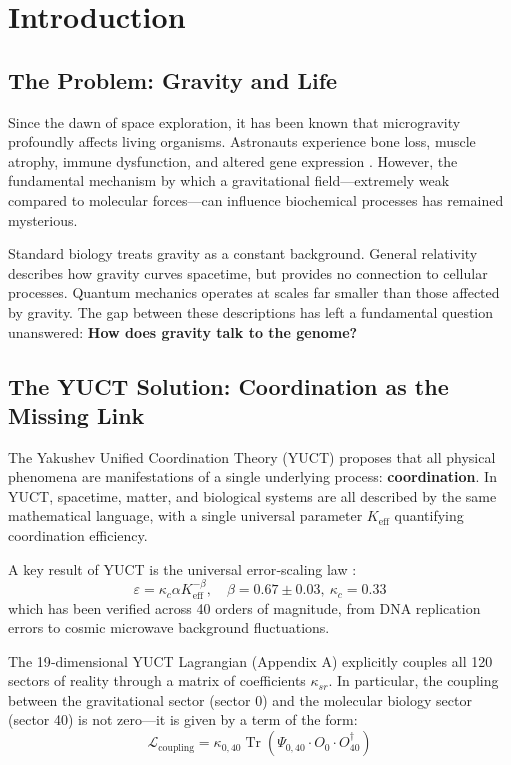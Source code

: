 \documentclass[12pt,a4paper]{article}
\theoremstyle{remark}
\newcommand{\Keff}{K_{\mathrm{eff}}}
\newcommand{\kappac}{\kappa_c}
\newcommand{\eps}{\varepsilon}
\begin{document}
	\tableofcontents
	\newpage
	
	\section{Introduction}
	\label{sec:intro}
	
	\subsection{The Problem: Gravity and Life}
	
	Since the dawn of space exploration, it has been known that microgravity profoundly affects living organisms. Astronauts experience bone loss, muscle atrophy, immune dysfunction, and altered gene expression \cite{NASA-GeneLab, SpaceX-2023}. However, the fundamental mechanism by which a gravitational field—extremely weak compared to molecular forces—can influence biochemical processes has remained mysterious.
	
	Standard biology treats gravity as a constant background. General relativity describes how gravity curves spacetime, but provides no connection to cellular processes. Quantum mechanics operates at scales far smaller than those affected by gravity. The gap between these descriptions has left a fundamental question unanswered: \textbf{How does gravity talk to the genome?}
	
	\subsection{The YUCT Solution: Coordination as the Missing Link}
	
	The Yakushev Unified Coordination Theory (YUCT) proposes that all physical phenomena are manifestations of a single underlying process: \textbf{coordination}. In YUCT, spacetime, matter, and biological systems are all described by the same mathematical language, with a single universal parameter \(\Keff\) quantifying coordination efficiency.
	
	A key result of YUCT is the universal error‑scaling law \cite{AppendixL}:
	\begin{equation}
		\eps = \kappac \alpha \Keff^{-\beta}, \quad \beta = 0.67 \pm 0.03,\ \kappac = 0.33
		\label{eq:universal-scaling}
	\end{equation}
	which has been verified across 40 orders of magnitude, from DNA replication errors to cosmic microwave background fluctuations.
	
	The 19‑dimensional YUCT Lagrangian (Appendix A) explicitly couples all 120 sectors of reality through a matrix of coefficients \(\kappa_{sr}\). In particular, the coupling between the gravitational sector (sector 0) and the molecular biology sector (sector 40) is not zero—it is given by a term of the form:
	\begin{equation}
		\mathcal{L}_{\text{coupling}} = \kappa_{0,40} \operatorname{Tr}(\Psi_{0,40} \cdot O_0 \cdot O_{40}^\dagger)
		\label{eq:coupling-general}
	\end{equation}
	
\end{document}
